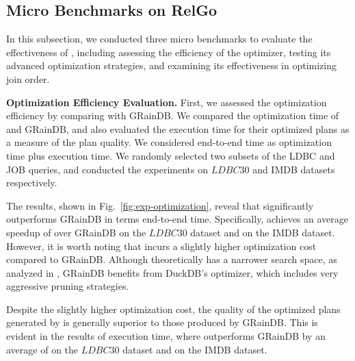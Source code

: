 
\subsection{Micro Benchmarks on RelGo}
\label{sec:experiment-opt}
In this subsection, we conducted three micro benchmarks to evaluate the effectiveness of \name,
including assessing the efficiency of the optimizer, testing its advanced optimization strategies, and examining its effectiveness in optimizing join order.

\noindent\textbf{Optimization Efficiency Evaluation.}
First, we assessed the optimization efficiency by comparing \name with GRainDB\cite{graindb}.
We compared the optimization time of \name and GRainDB, and also evaluated the execution time for their optimized plans as a measure of the plan quality.
We considered end-to-end time as optimization time plus execution time.
We randomly selected two subsets of the LDBC and JOB queries, and conducted the experiments on $LDBC30$ and IMDB datasets respectively.

The results, shown in Fig.~\ref{fig:exp-optimization}, reveal that \name significantly outperforms GRainDB in terms end-to-end time.
Specifically, \name achieves an average speedup of \revise{$7.5\times$} over GRainDB on the $LDBC30$ dataset and \revise{$3.8\times$} on the IMDB dataset.
However, it is worth noting that \name incurs a slightly higher optimization cost compared to GRainDB. Although \name theoretically has a narrower search space, as analyzed in , GRainDB benefits from DuckDB's optimizer, which includes very aggressive pruning strategies.

Despite the slightly higher optimization cost, the quality of the optimized plans generated by \name is generally superior to those produced by GRainDB. This is evident in the results of execution time, where \name outperforms GRainDB by an average of \revise{$9.7\times$} on the $LDBC30$ dataset and \revise{$4.3\times$} on the IMDB dataset. %

